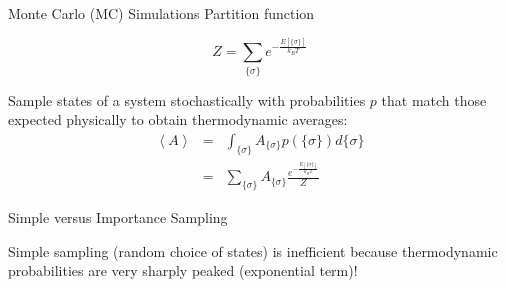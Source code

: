 \documentclass[aspectratio=169]{beamer}
\begin{document}
    \begin{frame}{Monte Carlo (MC) Simulations}
        Partition function

        \begin{equation*}
            Z = \sum_{\{\sigma\}} e^{-\frac{E[\{\sigma\}]}{k_BT}}
        \end{equation*}

        Sample states of a system stochastically with probabilities $p$ that match those expected physically to obtain thermodynamic averages:
        \begin{eqnarray*}
            \left< A \right> & = & \int_{\{\sigma\}} A_{\{\sigma\}} p(\{\sigma\}) d \{\sigma\}\\
            & = & \sum_{\{\sigma\}} A_{\{\sigma\}} \frac{e^{-\frac{E[\{\sigma\}]}{k_BT}}}{Z}
        \end{eqnarray*}

    \end{frame}

    \begin{frame}{Simple versus Importance Sampling}

        Simple sampling (random choice of states) is inefficient because thermodynamic probabilities are very sharply peaked (exponential term)!

        \begin{figure}
        \end{figure}

    \end{frame}
\end{document}

